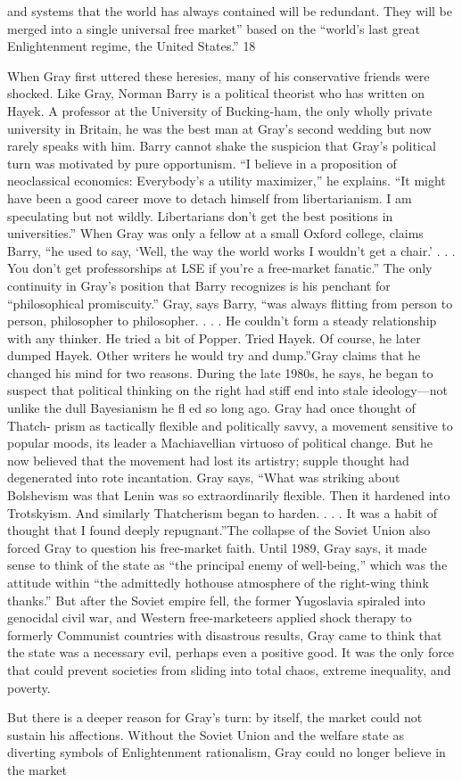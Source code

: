 and systems that the world has always contained will be redundant. They will be merged into a single universal free market” based on the “world’s last great Enlightenment regime, the United States.” {\color{blue} 18 } {\par} When Gray first uttered these heresies, many of his conservative friends were shocked. Like Gray, Norman Barry is a political theorist who has written on Hayek. A professor at the University of Bucking-ham, the only wholly private university in Britain, he was the best man at Gray’s second wedding but now rarely speaks with him. Barry cannot shake the suspicion that Gray’s political turn was motivated by pure opportunism. “I believe in a proposition of neoclassical economics: Everybody’s a utility maximizer,” he explains. “It might have been a good career move to detach himself from libertarianism. I am speculating but not wildly. Libertarians don’t get the best positions in universities.” When Gray was only a fellow at a small Oxford college, claims Barry, “he used to say, ‘Well, the way the world works I wouldn’t get a chair.’ . . . You don’t get professorships at LSE if you’re a free-market fanatic.” The only continuity in Gray’s position that Barry recognizes is his penchant for “philosophical promiscuity.” Gray, says Barry, “was always flitting from person to person, philosopher to philosopher. . . . He couldn’t form a steady relationship with any thinker. He tried a bit of Popper. Tried Hayek. Of course, he later dumped Hayek. Other writers he would try and dump.”Gray claims that he changed his mind for two reasons. During the late 1980s, he says, he began to suspect that political thinking on the right had stiff end into stale ideology—not unlike the dull Bayesianism he fl ed so long ago. Gray had once thought of Thatch- prism as tactically flexible and politically savvy, a movement sensitive to popular moods, its leader a Machiavellian virtuoso of political change. But he now believed that the movement had lost its artistry; supple thought had degenerated into rote incantation. Gray says, “What was striking about Bolshevism was that Lenin was so extraordinarily flexible. Then it hardened into Trotskyism. And similarly Thatcherism began to harden. . . . It was a habit of thought that I found deeply repugnant.”The collapse of the Soviet Union also forced Gray to question his free-market faith. Until 1989, Gray says, it made sense to think of the state as “the principal enemy of well-being,” which was the attitude within “the admittedly hothouse atmosphere of the right-wing think thanks.” But after the Soviet empire fell, the former Yugoslavia spiraled into genocidal civil war, and Western free-marketeers applied shock therapy to formerly Communist countries with disastrous results, Gray came to think that the state was a necessary evil, perhaps even a positive good. It was the only force that could prevent societies from sliding into total chaos, extreme inequality, and poverty.{\par} But there is a deeper reason for Gray’s turn: by itself, the market could not sustain his affections. Without the Soviet Union and the welfare state as diverting symbols of Enlightenment rationalism, Gray could no longer believe in the market 
